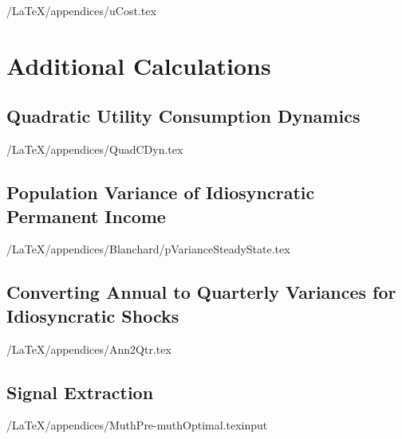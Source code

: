\documentclass[titlepage]{\econtex}\newcommand{\texname}{cAndCwithStickyE}
\begin{document}
\econtexRoot/LaTeX/appendices/uCost.tex




\section{Additional Calculations}

\subsection{Quadratic Utility Consumption Dynamics}\label{appendix:QuadCDyn}

\econtexRoot/LaTeX/appendices/QuadCDyn.tex






\subsection{Population Variance of Idiosyncratic Permanent Income}\label{appendix:pss}

\econtexRoot/LaTeX/appendices/Blanchard/pVarianceSteadyState.tex

\subsection{Converting Annual to Quarterly Variances for Idiosyncratic Shocks}\label{appendix:Ann2Qtr}

\econtexRoot/LaTeX/appendices/Ann2Qtr.tex

\subsection{\cite{muthOptimal} Signal Extraction}\label{appendix:Muth}

\econtexRoot/LaTeX/appendices/MuthPre-muthOptimal.texinput
\end{document}

